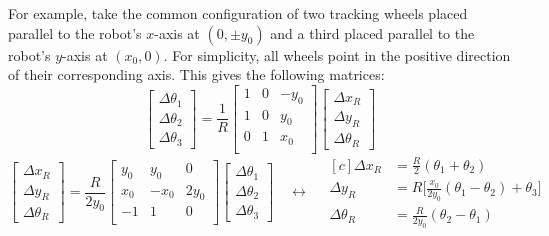 \documentclass{article}
\begin{document}
For example, take the common configuration of two tracking wheels placed parallel to the robot's $x$-axis at $(0,\pm y_0)$ and a third placed parallel to the robot's $y$-axis at $(x_0,0)$. For simplicity, all wheels point in the positive direction of their corresponding axis. This gives the following matrices:
\begin{equation*}
    \begin{bmatrix}
        \Delta \theta_1\\
        \Delta \theta_2\\
        \Delta \theta_3
    \end{bmatrix}
    =
    \frac{1}{R}
    \begin{bmatrix}
        1 & 0 & -y_0 \\
        1 & 0 & y_0 \\
        0 & 1 & x_0 \\
    \end{bmatrix}
    \begin{bmatrix}
        \Delta x_R\\
        \Delta y_R\\
        \Delta \theta_R
    \end{bmatrix}
\end{equation*}
\begin{equation*}
    \begin{bmatrix}
        \Delta x_R\\
        \Delta y_R\\
        \Delta \theta_R
    \end{bmatrix}
    =
    \frac{R}{2y_0}
    \begin{bmatrix}
        y_0 & y_0 & 0\\
        x_0 & -x_0 & 2y_0\\
        -1 & 1 & 0\\
    \end{bmatrix}
    \begin{bmatrix}
        \Delta \theta_1\\
        \Delta \theta_2\\
        \Delta \theta_3
    \end{bmatrix}
    \quad\leftrightarrow\quad
    \begin{aligned}[c]
        \Delta x_R &= \frac{R}{2}(\theta_1 + \theta_2)\\
        \Delta y_R &= R\bigg[\frac{x_0}{2y_0}(\theta_1 - \theta_2) + \theta_3\bigg]\\
        \Delta \theta_R &= \frac{R}{2y_0}(\theta_2 - \theta_1)
    \end{aligned}
\end{equation*}
\end{document}
